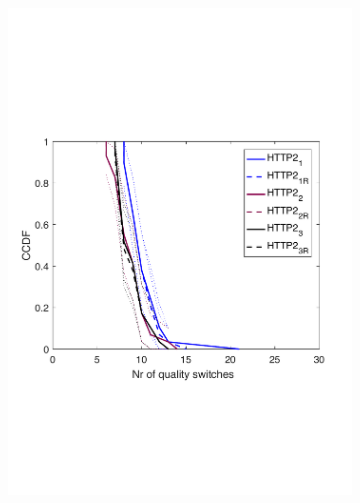 \begin{figure}[t!]
\begin{subfigure}[t]{0.33\textwidth}
    \includegraphics[trim={0 7cm 0 7cm}, scale=0.25]{figures/CDF_cntswitch_squad_parallel_http2_nd18.pdf}
    \caption{}
    \label{fig:phttp2cntsw}
  \end{subfigure}
  \begin{subfigure}[t]{0.33\textwidth}
  \captionsetup{justification=centering,margin=1.5cm}

\end{subfigure}
\end{figure}
